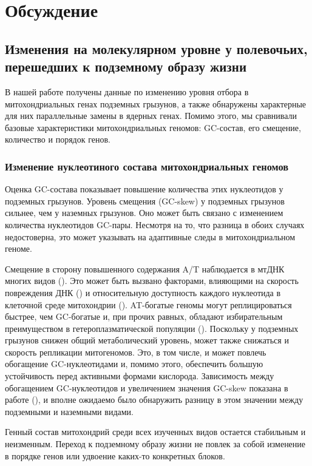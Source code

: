 \chapter{Обсуждение} \label{discussion}

\section{Изменения на молекулярном уровне у полевочьих, перешедших к подземному образу жизни}

В нашей работе получены данные по изменению уровня отбора в митохондриальных генах подземных грызунов, а также обнаружены характерные для них параллельные замены в ядерных генах. Помимо этого, мы сравнивали базовые характеристики митохондриальных геномов: GC-состав, его смещение, количество и порядок генов. 

\subsection{Изменение нуклеотиного состава митохондриальных геномов}

Оценка GC-состава показывает повышение количества этих нуклеотидов у подземных грызунов. Уровень смещения (GC-skew) у подземных грызунов сильнее, чем у наземных грызунов. Оно может быть связано с изменением количества нуклеотидов GC-пары. Несмотря на то, что разница в обоих случаях недостоверна, это может указывать на адаптивные следы в митохондриальном геноме. 

Смещение в сторону повышенного содержания A/T наблюдается в мтДНК многих видов (\cite{Ballard2004}). Это может быть вызвано факторами, влияющими на скорость повреждения ДНК (\cite{Martin1995}) и относительную доступность каждого нуклеотида в клеточной среде митохондрии (\cite{Xia1996}). AT-богатые геномы могут реплицироваться быстрее, чем GC-богатые и, при прочих равных, обладают избирательным преимуществом в гетероплазматической популяции (\cite{Ballard2000}). Поскольку у подземных грызунов снижен общий метаболический уровень, может также снижаться и скорость репликации митогеномов. Это, в том числе, и может повлечь обогащение GC-нуклеотидами и, помимо этого, обеспечить большую устойчивость перед активными формами кислорода. Зависимость между обогащением GC-нуклеотидов и увеличением значения GC-skew показана в работе (\cite{Saccone2000}), и вполне ожидаемо было обнаружить разницу в этом значении между подземными и наземными видами. 

Генный состав митохондрий среди всех изученных видов остается стабильным и неизменным. Переход к подземному образу жизни не повлек за собой изменение в порядке генов или удвоение каких-то конкретных блоков. 

